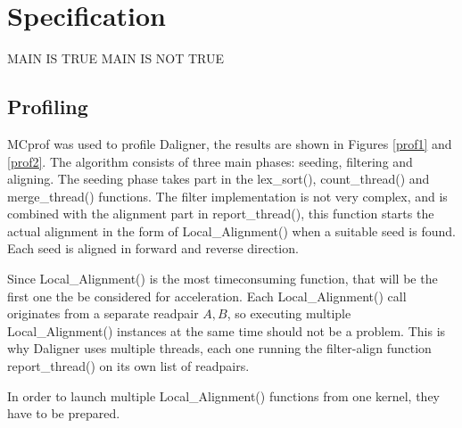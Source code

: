\documentclass[../main/thesis.tex]{subfiles}
\begin{document}
\chapter{Specification}
\ifdefined\main
\acresetall
MAIN IS TRUE
\newcommand{\code}{../3_concept/code/}
\else
MAIN IS NOT TRUE

\fi

\section{Profiling}

MCprof \cite{mcprof1}\cite{mcprof2} was used to profile Daligner, the results are shown in Figures \ref{prof1} and \ref{prof2}.
The algorithm consists of three main phases: seeding, filtering and aligning.
The seeding phase takes part in the lex\_sort(), count\_thread() and merge\_thread() functions.
The filter implementation is not very complex, and is combined with the alignment part in report\_thread(), this function starts the actual alignment in the form of Local\_Alignment() when a suitable seed is found.
Each seed is aligned in forward and reverse direction.




Since Local\_Alignment() is the most timeconsuming function, that will be the first one the be considered for acceleration.
Each Local\_Alignment() call originates from a separate readpair $A, B$, so executing multiple Local\_Alignment() instances at the same time should not be a problem.
This is why Daligner uses multiple threads, each one running the filter-align function report\_thread() on its own list of readpairs.

In order to launch multiple Local\_Alignment() functions from one kernel, they have to be prepared.
\end{document}
